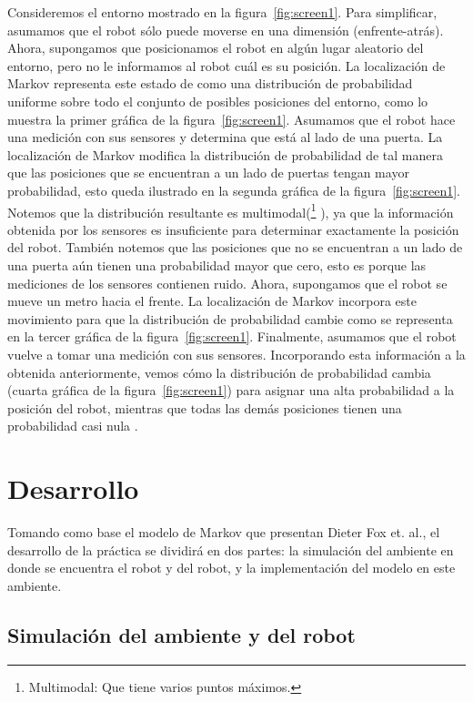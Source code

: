 Consideremos el entorno mostrado en la figura~\ref{fig:screen1}. Para simplificar, asumamos que el robot sólo puede moverse en una dimensión (enfrente-atrás). Ahora, supongamos que posicionamos el robot en algún lugar aleatorio del entorno, pero no le informamos al robot cuál es su posición. La localización de Markov representa este estado de  como una distribución de probabilidad uniforme sobre todo el conjunto de posibles posiciones del entorno, como lo muestra la primer gráfica de la figura~\ref{fig:screen1}. Asumamos que el robot hace una medición con sus sensores y determina que está al lado de una puerta. La localización de Markov modifica la distribución de probabilidad de tal manera que las posiciones que se encuentran a un lado de puertas tengan mayor probabilidad, esto queda ilustrado en la segunda gráfica de la figura~\ref{fig:screen1}. Notemos que la distribución resultante es multimodal(\footnote{Multimodal: Que tiene varios puntos máximos.} ), ya que la información obtenida por los sensores es insuficiente para determinar exactamente la posición del robot. También notemos que las posiciones que no se encuentran a un lado de una puerta aún tienen una probabilidad mayor que cero, esto es porque las mediciones de los sensores contienen ruido. Ahora, supongamos que el robot se mueve un metro hacia el frente. La localización de Markov incorpora este movimiento para que la distribución de probabilidad cambie como se representa en la tercer gráfica de la figura~\ref{fig:screen1}. Finalmente, asumamos que el robot vuelve a tomar una medición con sus sensores. Incorporando esta información a la obtenida anteriormente, vemos cómo la distribución de probabilidad cambia (cuarta gráfica de la figura~\ref{fig:screen1}) para asignar una alta probabilidad a la posición del robot, mientras que todas las demás posiciones tienen una probabilidad casi nula \parencite{Dieter1999}. 

\section{Desarrollo}

Tomando como base el modelo de Markov que presentan Dieter Fox et. al., el desarrollo de la práctica se dividirá en dos partes: la simulación del ambiente en donde se encuentra el robot y del robot, y la implementación del modelo en este ambiente.

\subsection{Simulación del ambiente y del robot}


